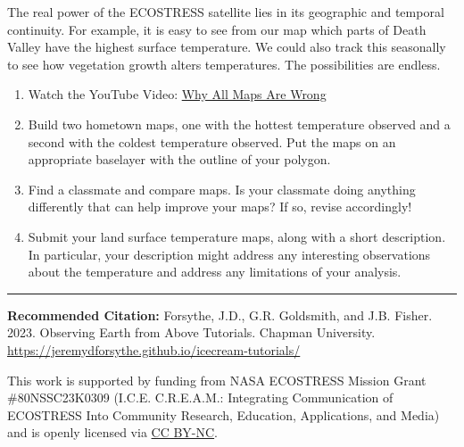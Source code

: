 \documentclass[oneside,a4paper,11pt,explicit]{book}
\begin{document}

The real power of the ECOSTRESS satellite lies in its geographic and temporal continuity. For example, it is easy to see from our map which parts of Death Valley have the highest surface temperature. We could also track this seasonally to see how vegetation growth alters temperatures. The possibilities are endless.

\vspace{1em}

\begin{tcolorbox}[colback=yellow!5!white,colframe=MACred,title= \vspace{.2em} \Large Make a Map Assignments]
    \large
    \begin{enumerate}
        \item Watch the YouTube Video: \href{https://youtu.be/kIID5FDi2JQ}{Why All Maps Are Wrong}
        \item Build two hometown maps, one with the hottest temperature observed and a second with the coldest temperature observed. Put the maps on an appropriate baselayer with the outline of your polygon. 
        \item Find a classmate and compare maps. Is your classmate doing anything differently that can help improve your maps? If so, revise accordingly! 
        \item Submit your land surface temperature maps, along with a short description. In particular, your description might address any interesting observations about the temperature and address any limitations of your analysis.
    \end{enumerate}
\end{tcolorbox}

\vfill

\hrule

\vspace{1em}

\small \textbf{Recommended Citation:} Forsythe, J.D., G.R. Goldsmith, and J.B. Fisher. 2023. Observing Earth from Above Tutorials. Chapman University. \url{https://jeremydforsythe.github.io/icecream-tutorials/}

\vspace{1em}

This work is supported by funding from NASA ECOSTRESS Mission Grant \#80NSSC23K0309 (I.C.E. C.R.E.A.M.: Integrating Communication of ECOSTRESS Into Community Research, Education, Applications, and Media) and is openly licensed via \href{https://creativecommons.org/licenses/by-nc/4.0/}{CC BY-NC}.
\end{document}
